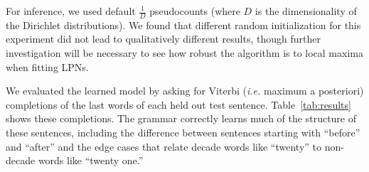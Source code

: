 \documentclass[10pt, twocolumn]{article}
\begin{document}
For inference, we used default $\frac{1}{D}$ pseudocounts (where $D$ is the
dimensionality of the Dirichlet distributions). We found that different random
initialization for this experiment did not lead to qualitatively different
results, though further investigation will be necessary to see how
robust the algorithm is to local maxima when fitting LPNs.

We evaluated the learned model by asking for Viterbi ({\it i.e.} maximum a
posteriori) completions of the last words of each held out test
sentence. Table~\ref{tab:results} shows these completions. The grammar
correctly learns much of the structure of these sentences, including
the difference between sentences starting with ``before'' and
``after'' and the edge cases that relate decade words like ``twenty''
to non-decade words like ``twenty one.''
\end{document}
